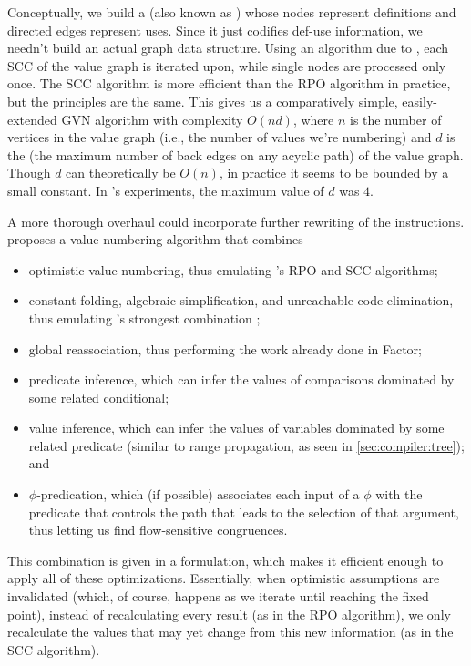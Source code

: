 Conceptually, we build a  (also known as  \autocite{Simpson}) whose nodes represent definitions and directed edges
represent uses.  Since it just codifies def-use information, we needn't build
an actual graph data structure.  Using an algorithm due to \citeauthor{Tarjan}
\autocite*{Tarjan}, each \gls{SCC} of the value graph is iterated upon, while
single nodes are processed only once.  The \gls{SCC} algorithm is more
efficient than the \gls{RPO} algorithm in practice, but the principles are the
same.  This gives us a comparatively simple, easily-extended \gls{GVN}
algorithm with complexity $O(nd)$, where $n$ is the number of vertices in the
value graph (i.e., the number of values we're numbering) and $d$ is the
 (the maximum number of back edges on any acyclic
path) of the value graph.  Though $d$ can theoretically be $O(n)$, in practice
it seems to be bounded by a small constant.  In \citeauthor{Simpson}'s
experiments, the maximum value of $d$ was $4$.

A more thorough overhaul could incorporate further rewriting of the
instructions.   \autocite*{Gargi} proposes a
 value numbering algorithm that combines
\begin{itemize}
  \item optimistic value numbering, thus emulating \citeauthor{Simpson}'s
        \gls{RPO} and \gls{SCC} algorithms; 
  \item constant folding, algebraic simplification, and unreachable code
        elimination, thus emulating \citeauthor{Click}'s strongest combination
        \autocite{Click};
  \item global reassociation, thus performing the work already done in Factor;
  \item predicate inference, which can infer the values of comparisons
        dominated by some related conditional;
  \item value inference, which can infer the values of variables dominated by
        some related predicate (similar to range propagation, as seen in
        \cref{sec:compiler:tree}); and
  \item $\phi$-predication, which (if possible) associates each input of a
        $\phi$ with the predicate that controls the path that leads to the
        selection of that argument, thus letting us find flow-sensitive
        congruences.
\end{itemize}

This combination is given in a  formulation, which makes it
efficient enough to apply all of these optimizations.  Essentially, when
optimistic assumptions are invalidated (which, of course, happens as we iterate
until reaching the fixed point), instead of recalculating every result (as in
the \gls{RPO} algorithm), we only recalculate the values that may yet change
from this new information (as in the \gls{SCC} algorithm).

